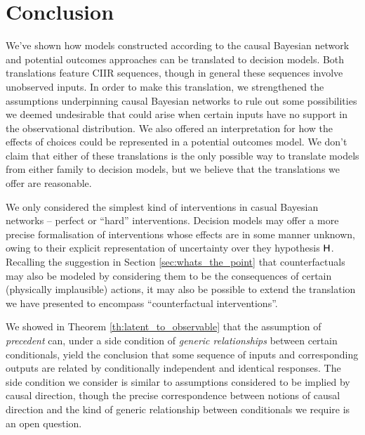 

\section{Conclusion}

We've shown how models constructed according to the causal Bayesian network and potential outcomes approaches can be translated to decision models. Both translations feature CIIR sequences, though in general these sequences involve unobserved inputs. In order to make this translation, we strengthened the assumptions underpinning causal Bayesian networks to rule out some possibilities we deemed undesirable that could arise when certain inputs have no support in the observational distribution. We also offered an interpretation for how the effects of choices could be represented in a potential outcomes model. We don't claim that either of these translations is the only possible way to translate models from either family to decision models, but we believe that the translations we offer are reasonable.

We only considered the simplest kind of interventions in casual Bayesian networks -- perfect or ``hard'' interventions. Decision models may offer a more precise formalisation of interventions whose effects are in some manner unknown, owing to their explicit representation of uncertainty over they hypothesis $\mathsf{H}$. Recalling the suggestion in Section \ref{sec:whats_the_point} that counterfactuals may also be modeled by considering them to be the consequences of certain (physically implausible) actions, it may also be possible to extend the translation we have presented to encompass ``counterfactual interventions''.

We showed in Theorem \ref{th:latent_to_observable} that the assumption of \emph{precedent} can, under a side condition of \emph{generic relationships} between certain conditionals, yield the conclusion that some sequence of inputs and corresponding outputs are related by conditionally independent and identical responses. The side condition we consider is similar to assumptions considered to be implied by causal direction, though the precise correspondence between notions of causal direction and the kind of generic relationship between conditionals we require is an open question.

